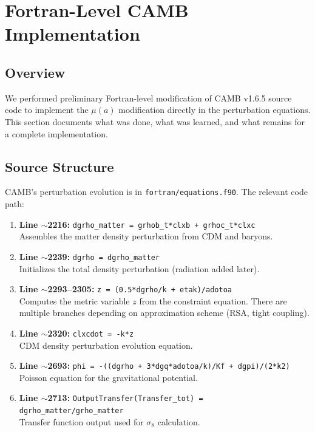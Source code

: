 \documentclass[11pt,letterpaper]{article}
\begin{document}
\section{Fortran-Level CAMB Implementation}
\label{sec:fortran}

\subsection{Overview}

We performed preliminary Fortran-level modification of CAMB v1.6.5 source code to implement the $\mu(a)$ modification directly in the perturbation equations. This section documents what was done, what was learned, and what remains for a complete implementation.

\subsection{Source Structure}

CAMB's perturbation evolution is in \texttt{fortran/equations.f90}. The relevant code path:

\begin{enumerate}
\item \textbf{Line $\sim$2216:} \texttt{dgrho\_matter = grhob\_t*clxb + grhoc\_t*clxc} \\
Assembles the matter density perturbation from CDM and baryons.

\item \textbf{Line $\sim$2239:} \texttt{dgrho = dgrho\_matter} \\
Initializes the total density perturbation (radiation added later).

\item \textbf{Line $\sim$2293--2305:} \texttt{z = (0.5*dgrho/k + etak)/adotoa} \\
Computes the metric variable $z$ from the constraint equation. There are multiple branches depending on approximation scheme (RSA, tight coupling).

\item \textbf{Line $\sim$2320:} \texttt{clxcdot = -k*z} \\
CDM density perturbation evolution equation.

\item \textbf{Line $\sim$2693:} \texttt{phi = -((dgrho + 3*dgq*adotoa/k)/Kf + dgpi)/(2*k2)} \\
Poisson equation for the gravitational potential.

\item \textbf{Line $\sim$2713:} \texttt{OutputTransfer(Transfer\_tot) = dgrho\_matter/grho\_matter} \\
Transfer function output used for $\sigma_8$ calculation.
\end{enumerate}
\end{document}
